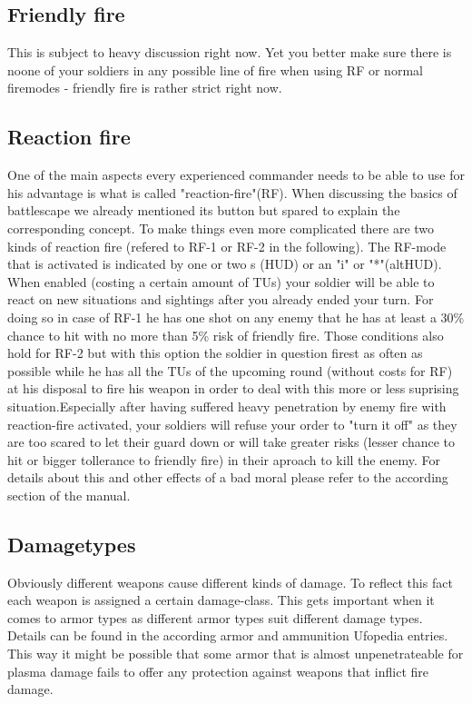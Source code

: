 \subsection{Friendly fire}
This is subject to heavy discussion right now. Yet you better make sure there is noone of your soldiers in any possible line of fire when using RF or normal firemodes - friendly fire is rather strict right now.

\subsection{Reaction fire}
One of the main aspects every experienced commander needs to be able to use for his advantage is what is called "reaction-fire"(RF). When discussing the basics of battlescape we already mentioned its button but spared to explain the corresponding concept. To make things even more complicated there are two kinds of reaction fire (refered to RF-1 or RF-2 in the following). The RF-mode that is activated is indicated by one or two \surd s (HUD) or an "i" or "*"(altHUD). When enabled (costing a certain amount of TUs) your soldier will be able to react on new situations and sightings after you already ended your turn. For doing so in case of RF-1 he has one shot on any enemy that he has at least a 30\% chance to hit with no more than 5\% risk of friendly fire. Those conditions also hold for RF-2 but with this option the soldier in question firest as often as possible while he has all the TUs of the upcoming round (without costs for RF) at his disposal to fire his weapon in order to deal with this more or less suprising situation.Especially after having suffered heavy penetration by enemy fire with reaction-fire activated, your soldiers will refuse your order to "turn it off" as they are too scared to let their guard down or will take greater risks (lesser chance to hit or bigger tollerance to friendly fire) in their aproach to kill the enemy. For details about this and other effects of a bad moral please refer to the according section of the manual.

\subsection{Damagetypes}
Obviously different weapons cause different kinds of damage. To reflect this fact each weapon is assigned a certain damage-class. This gets important when it comes to armor types as different armor types suit different damage types. Details can be found in the according armor and ammunition Ufopedia entries. This way it might be possible that some armor that is almost unpenetrateable for plasma damage fails to offer any protection against weapons that inflict fire damage.

